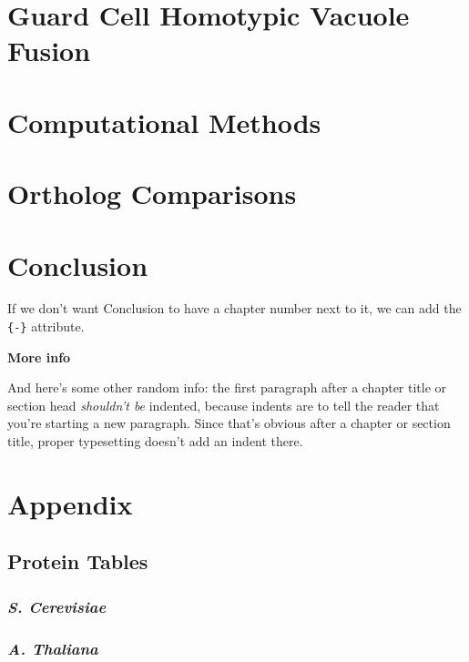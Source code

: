 \documentclass[12pt,twoside]{reedthesis}
\begin{document}
\chapter{Guard Cell Homotypic Vacuole Fusion}\label{GuardFusion}

\chapter{Computational Methods}\label{CompMethods}

\chapter{Ortholog Comparisons}\label{OrthoComp}

\chapter*{Conclusion}\label{conclusion}

If we don't want Conclusion to have a chapter number next to it, we can add the \texttt{\{-\}} attribute.

\textbf{More info}

And here's some other random info: the first paragraph after a chapter title or section head \emph{shouldn't be} indented, because indents are to tell the reader that you're starting a new paragraph. Since that's obvious after a chapter or section title, proper typesetting doesn't add an indent there.

\chapter*{Appendix}\label{appendix}

\section*{Protein Tables}\label{protein-tables}

\subsection*{\texorpdfstring{\emph{S. Cerevisiae}}{S. Cerevisiae}}\label{s.-cerevisiae}

\subsection*{\texorpdfstring{\emph{A. Thaliana}}{A. Thaliana}}\label{a.-thaliana}
\end{document}
